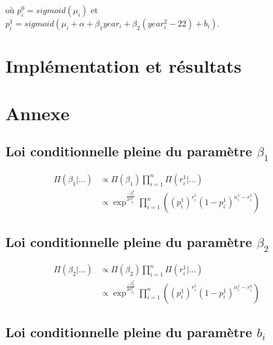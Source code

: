 \documentclass[
]{article}
\begin{document}
où \(p_i^0=sigmoid(\mu_i)\) et
\(p_i^1=sigmoid(\mu_i+\alpha+\beta_1 year_i+\beta_2(year_i^2-22)+b_i)\).

\hypertarget{impluxe9mentation-et-ruxe9sultats}{%
\section{Implémentation et
résultats}\label{impluxe9mentation-et-ruxe9sultats}}

\hypertarget{annexe}{%
\section{Annexe}\label{annexe}}

\hypertarget{loi-conditionnelle-pleine-du-paramuxe8tre-beta_1}{%
\subsection{\texorpdfstring{Loi conditionnelle pleine du paramètre
\(\beta_1\)}{Loi conditionnelle pleine du paramètre \textbackslash beta\_1}}\label{loi-conditionnelle-pleine-du-paramuxe8tre-beta_1}}

\begin{align*}
\Pi(\beta_1|...) &\propto \Pi(\beta_1) \prod_{i=1}^n\Pi(r_i^1|...) \\
&\propto \exp^{\frac{-\beta_1^2}{2\sigma_{\beta_1}^2}}\prod_{i=1}^n \left((p_i^1)^{r_i^1}(1-p_i^1)^{n_i^1-r_i^1}\right)
\end{align*}

\hypertarget{loi-conditionnelle-pleine-du-paramuxe8tre-beta_2}{%
\subsection{\texorpdfstring{Loi conditionnelle pleine du paramètre
\(\beta_2\)}{Loi conditionnelle pleine du paramètre \textbackslash beta\_2}}\label{loi-conditionnelle-pleine-du-paramuxe8tre-beta_2}}

\begin{align*}
\Pi(\beta_2|...) &\propto \Pi(\beta_2) \prod_{i=1}^n\Pi(r_i^1|...) \\
&\propto \exp^{\frac{-\beta_2^2}{2\sigma_{\beta_2}^2}}\prod_{i=1}^n \left((p_i^1)^{r_i^1}(1-p_i^1)^{n_i^1-r_i^1}\right)
\end{align*}

\hypertarget{loi-conditionnelle-pleine-du-paramuxe8tre-b_i}{%
\subsection{\texorpdfstring{Loi conditionnelle pleine du paramètre
\(b_i\)}{Loi conditionnelle pleine du paramètre b\_i}}\label{loi-conditionnelle-pleine-du-paramuxe8tre-b_i}}
\end{document}
